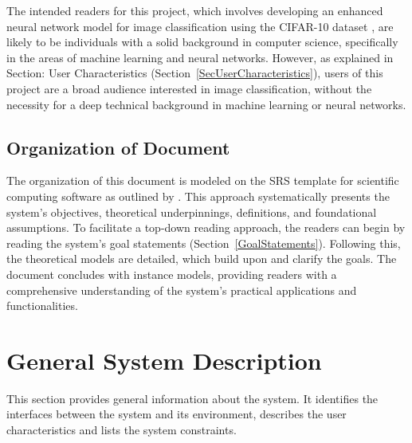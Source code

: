 \documentclass[12pt]{article}
\begin{document}
The intended readers for this project, which involves developing an enhanced neural network model for image 
classification using the CIFAR-10 dataset \cite{CIFAR}, are likely to be individuals with a solid background in computer science, 
specifically in the areas of machine learning and neural networks. However, as explained in Section: 
User Characteristics (Section~\ref{SecUserCharacteristics}), users of this project  are a broad audience 
interested in image classification, without the necessity for a deep technical background in machine learning or 
neural networks.

\subsection{Organization of Document}

The organization of this document is modeled on the SRS template for scientific computing software as outlined 
by \citet{SmithandLai2005}. This approach systematically presents the system's objectives, theoretical underpinnings, 
definitions, and foundational assumptions. To facilitate a top-down reading approach, the readers 
can begin by reading the system's goal statements (Section~\ref{GoalStatements}). 
Following this, the theoretical models are detailed, which build upon and clarify the goals. 
The document concludes with instance models, providing readers with a comprehensive understanding of the 
system's practical applications and functionalities.

\section{General System Description}

This section provides general information about the system.  It identifies the
interfaces between the system and its environment, describes the user
characteristics and lists the system constraints.  
\end{document}
